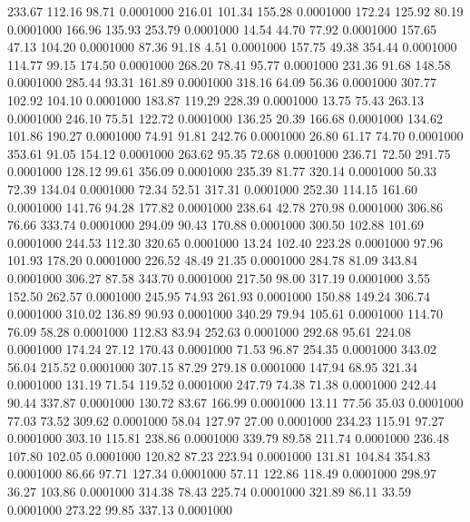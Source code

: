  233.67  112.16   98.71   0.0001000
 216.01  101.34  155.28   0.0001000
 172.24  125.92   80.19   0.0001000
 166.96  135.93  253.79   0.0001000
  14.54   44.70   77.92   0.0001000
 157.65   47.13  104.20   0.0001000
  87.36   91.18    4.51   0.0001000
 157.75   49.38  354.44   0.0001000
 114.77   99.15  174.50   0.0001000
 268.20   78.41   95.77   0.0001000
 231.36   91.68  148.58   0.0001000
 285.44   93.31  161.89   0.0001000
 318.16   64.09   56.36   0.0001000
 307.77  102.92  104.10   0.0001000
 183.87  119.29  228.39   0.0001000
  13.75   75.43  263.13   0.0001000
 246.10   75.51  122.72   0.0001000
 136.25   20.39  166.68   0.0001000
 134.62  101.86  190.27   0.0001000
  74.91   91.81  242.76   0.0001000
  26.80   61.17   74.70   0.0001000
 353.61   91.05  154.12   0.0001000
 263.62   95.35   72.68   0.0001000
 236.71   72.50  291.75   0.0001000
 128.12   99.61  356.09   0.0001000
 235.39   81.77  320.14   0.0001000
  50.33   72.39  134.04   0.0001000
  72.34   52.51  317.31   0.0001000
 252.30  114.15  161.60   0.0001000
 141.76   94.28  177.82   0.0001000
 238.64   42.78  270.98   0.0001000
 306.86   76.66  333.74   0.0001000
 294.09   90.43  170.88   0.0001000
 300.50  102.88  101.69   0.0001000
 244.53  112.30  320.65   0.0001000
  13.24  102.40  223.28   0.0001000
  97.96  101.93  178.20   0.0001000
 226.52   48.49   21.35   0.0001000
 284.78   81.09  343.84   0.0001000
 306.27   87.58  343.70   0.0001000
 217.50   98.00  317.19   0.0001000
   3.55  152.50  262.57   0.0001000
 245.95   74.93  261.93   0.0001000
 150.88  149.24  306.74   0.0001000
 310.02  136.89   90.93   0.0001000
 340.29   79.94  105.61   0.0001000
 114.70   76.09   58.28   0.0001000
 112.83   83.94  252.63   0.0001000
 292.68   95.61  224.08   0.0001000
 174.24   27.12  170.43   0.0001000
  71.53   96.87  254.35   0.0001000
 343.02   56.04  215.52   0.0001000
 307.15   87.29  279.18   0.0001000
 147.94   68.95  321.34   0.0001000
 131.19   71.54  119.52   0.0001000
 247.79   74.38   71.38   0.0001000
 242.44   90.44  337.87   0.0001000
 130.72   83.67  166.99   0.0001000
  13.11   77.56   35.03   0.0001000
  77.03   73.52  309.62   0.0001000
  58.04  127.97   27.00   0.0001000
 234.23  115.91   97.27   0.0001000
 303.10  115.81  238.86   0.0001000
 339.79   89.58  211.74   0.0001000
 236.48  107.80  102.05   0.0001000
 120.82   87.23  223.94   0.0001000
 131.81  104.84  354.83   0.0001000
  86.66   97.71  127.34   0.0001000
  57.11  122.86  118.49   0.0001000
 298.97   36.27  103.86   0.0001000
 314.38   78.43  225.74   0.0001000
 321.89   86.11   33.59   0.0001000
 273.22   99.85  337.13   0.0001000
